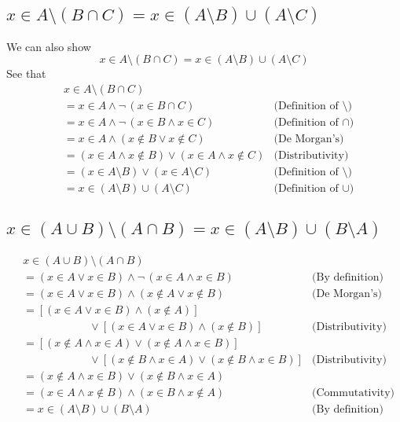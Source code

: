 \documentclass{report}
\theoremstyle{definition}
\begin{document}
\subsection{$x\in A\setminus(B\cap C)=x\in(A\setminus B)\cup(A\setminus C)$}
We can also show
\begin{equation*}
x\in A\setminus(B\cap C)=x\in(A\setminus B)\cup(A\setminus C)
\end{equation*}
See that
\begin{align*}
&x\in A\setminus(B\cap C)&\\
&=x\in A\land\neg\,(x\in B\cap C)&\text{(Definition of $\setminus$)}\\
&=x\in A\land\neg\,(x\in B\land x\in C)&\text{(Definition of $\cap$)}\\
&=x\in A\land(x\notin B\lor x\notin C)&\text{(De Morgan's)}\\
&=(x\in A\land x\notin B)\lor(x\in A\land x\notin C)&\text{(Distributivity)}\\
&=(x\in A\setminus B)\lor(x\in A\setminus C)&\text{(Definition of $\setminus$)}\\
&=x\in(A\setminus B)\cup(A\setminus C)&\text{(Definition of $\cup$)}
\end{align*}

\subsection{$x\in(A\cup B)\setminus(A\cap B)=x\in(A\setminus B)\cup(B\setminus A)$}
\begin{align*}
&x\in(A\cup B)\setminus(A\cap B)&\\
&=(x\in A\lor x\in B)\land\neg\,(x\in A\land x\in B)&(\text{By definition)}\\
&=(x\in A\lor x\in B)\land(x\notin A\lor x\notin B)&\text{(De Morgan's)}\\
&=[(x\in A\lor x\in B)\land(x\notin A)]&\\
&\qquad\qquad\qquad\lor[(x\in A\lor x\in B)\land(x\notin B)]&\text{(Distributivity)}\\
&=[(x\notin A\land x\in A)\lor(x\notin A\land x\in B)]&\\
&\qquad\qquad\qquad\lor[(x\notin B\land x\in A)\lor(x\notin B\land x\in B)]&\text{(Distributivity)}\\
&=(x\notin A\land x\in B)\lor(x\notin B\land x\in A)&\\
&=(x\in A\land x\notin B)\land(x\in B\land x\notin A)&\text{(Commutativity)}\\
&=x\in(A\setminus B)\cup(B\setminus A)&\text{(By definition)}
\end{align*}
\end{document}
